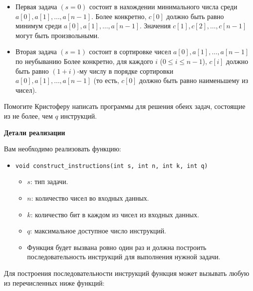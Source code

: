 \begin{itemize}
\item Первая задача $(s=0)$ состоит в нахождении минимального числа среди $a[0],a[1],\ldots,a[n-1]$. Более конкретно, $c[0]$ должно быть равно минимум среди $a[0], a[1], \ldots, a[n-1]$. Значения $c[1], c[2], \ldots, c[n-1]$ могут быть произвольными.

\item Вторая задача $(s=1)$ состоит в сортировке чисел $a[0],a[1],\ldots,a[n-1]$ по неубыванию Более конкретно, для каждого $i$ ($0\leq i\leq n-1$), $c[i]$ должно быть равно $(1+i)$-му числу в порядке сортировки $a[0],a[1],\ldots, a[n-1]$ (то есть, $c[0]$ должно быть равно наименьшему из чисел).
\end{itemize}


Помогите Кристоферу написать программы для решения обеих задач, состоящие из не более, чем $q$ инструкций.

\textbf{Детали реализации}

Вам необходимо реализовать функцию:
\begin{itemize}
\item \texttt{void construct\_instructions(int s, int n, int k, int q)}
\begin{itemize}
\item $s$: тип задачи.
\item $n$: количество чисел во входных данных.
\item $k$: количество бит в каждом из чисел из входных данных.
\item $q$: максимальное доступное число инструкций.
\item Функция будет вызвана ровно один раз и должна построить последовательность инструкций для выполнения нужной задачи. 
\end{itemize}
\end{itemize}

Для построения последовательности инструкций функция может вызывать любую из перечисленных ниже функций:


